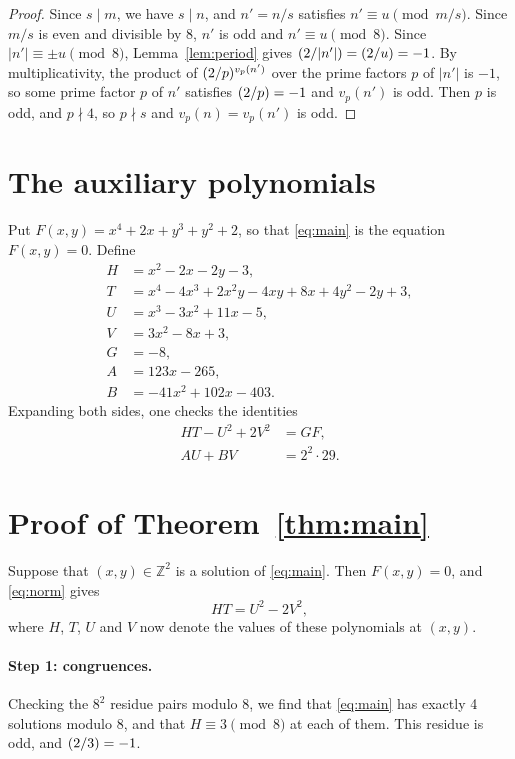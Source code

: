 \documentclass[11pt]{article}
\newcommand{\Z}{\mathbb{Z}}
\newcommand{\leg}[2]{\mathchoice{\biggl(\dfrac{#1}{#2}\biggr)}{(#1/#2)}{(#1/#2)}{(#1/#2)}}
\begin{document}
\begin{proof}
Since $s\mid m$, we have $s\mid n$, and $n'=n/s$ satisfies $n'\equiv u\pmod{m/s}$. Since $m/s$ is even and divisible by $8$, $n'$ is odd and $n'\equiv u\pmod{8}$. Since $|n'|\equiv\pm u\pmod{8}$, Lemma~\ref{lem:period} gives $\leg{2}{|n'|}=\leg{2}{u}=-1$. By multiplicativity, the product of $\leg{2}{p}^{v_p(n')}$ over the prime factors $p$ of $|n'|$ is $-1$, so some prime factor $p$ of $n'$ satisfies $\leg{2}{p}=-1$ and $v_p(n')$ is odd. Then $p$ is odd, and $p\nmid4$, so $p\nmid s$ and $v_p(n)=v_p(n')$ is odd.
\end{proof}

\section{The auxiliary polynomials}

Put $F(x,y)=x^{4}+2x+y^{3}+y^{2}+2$, so that \eqref{eq:main} is the equation $F(x,y)=0$. Define
\begin{align*}
H&=x^{2}-2x-2y-3,\\
T&=x^{4}-4x^{3}+2x^{2}y-4xy+8x+4y^{2}-2y+3,\\
U&=x^{3}-3x^{2}+11x-5,\\
V&=3x^{2}-8x+3,\\
G&=-8,\\
A&=123x-265,\\
B&=-41x^{2}+102x-403.
\end{align*}
Expanding both sides, one checks the identities
\begin{align}
HT-U^2+2V^2&=GF,\label{eq:norm}\\
AU+BV&=2^{2}\cdot 29.\label{eq:bezout}
\end{align}

\section{Proof of Theorem~\ref{thm:main}}

Suppose that $(x,y)\in\Z^2$ is a solution of \eqref{eq:main}. Then $F(x,y)=0$, and \eqref{eq:norm} gives
\begin{equation}\label{eq:HT}
HT=U^2-2V^2,
\end{equation}
where $H$, $T$, $U$ and $V$ now denote the values of these polynomials at $(x,y)$.

\paragraph{Step 1: congruences.} Checking the $8^2$ residue pairs modulo $8$, we find that \eqref{eq:main} has exactly 4 solutions modulo $8$, and that $H\equiv3\pmod{8}$ at each of them. This residue is odd, and $\leg{2}{3}=-1$.
\end{document}
